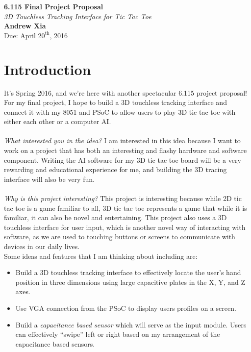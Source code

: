 \documentclass[12pt,twoside]{article}
\newcommand{\andrew}{Andrew Xia}
\newcommand{\psetnum}{6.115 Final Project Proposal}
\newcommand{\duedate}{Due: April $20^{\text{th}}$, 2016}
\begin{document}
 
\begin{center} {\bf \large \psetnum}
\\ \emph{3D Touchless Tracking Interface for Tic Tac Toe}
\\ {\bf \andrew}
\\ \duedate
\end{center}

\section{Introduction}
It's Spring 2016, and we're here with another spectacular 6.115 project proposal! For my final project, I hope to build a 3D touchless tracking interface and connect it with my 8051 and PSoC to allow users to play 3D tic tac toe with either each other or a computer AI. 
\\
\\ \emph{What interested you in the idea?} I am interested in this idea because I want to work on a project that has both an interesting and flashy hardware and software component. Writing the AI software for my 3D tic tac toe board will be a very rewarding and educational experience for me, and building the 3D tracing interface will also be very fun. 
\\ 
\\ \emph{Why is this project interesting?} This project is interesting because while 2D tic tac toe is a game familiar to all, 3D tic tac toe represents a game that while it is familiar, it can also be novel and entertaining. This project also uses a 3D touchless interface for user input, which is another novel way of interacting with software, as we are used to touching buttons or screens to communicate with devices in our daily lives. 
\\ Some ideas and features that I am thinking about including are:
\begin{itemize}
\item Build a 3D touchless tracking interface to effectively locate the user's hand position in three dimensions using large capacitive plates in the X, Y, and Z axes. 
\item Use VGA connection from the PSoC to display users profiles on a screen. 
\item Build a {\em capacitance based sensor} which will serve as the input module. Users can effectively ``swipe'' left or right based on my arrangement of the capacitance based sensors. 
\end{itemize}
\end{document}
